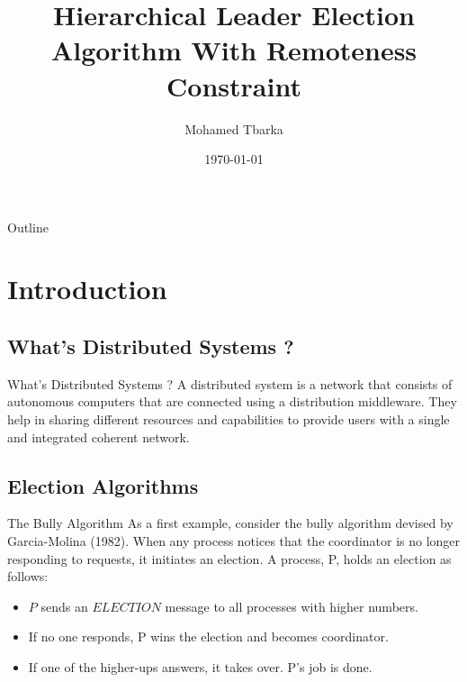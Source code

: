 \documentclass{beamer}
\title{Hierarchical Leader Election Algorithm With Remoteness Constraint}
\author{Mohamed Tbarka}
\date{\today}
\begin{document}

\frame{\titlepage}

\section[Outline]{}
\begin{frame}{Outline}
  \tableofcontents
\end{frame}

\section{Introduction}
\subsection{What's Distributed Systems ?}
\begin{frame}{What's Distributed Systems ?}
	A distributed system is a network that consists of autonomous computers that are connected using a distribution middleware. They help in sharing different resources and capabilities to provide users with a single and integrated coherent network.
\end{frame}
\subsection{Election Algorithms}
\begin{frame}{The Bully Algorithm}
  As a first example, consider the bully algorithm devised by Garcia-Molina (1982). When any process notices that the coordinator is no longer responding to requests, it initiates an election. A process, P, holds an election as follows:
  \pause
  \begin{itemize}
    \item <2-> $P$ sends an $ELECTION$ message to all processes with higher numbers.
    \item <3-> If no one responds, P wins the election and becomes coordinator.
    \item <4-> If one of the higher-ups answers, it takes over. P's job is done.
  \end{itemize}
\end{frame}
\end{document}
